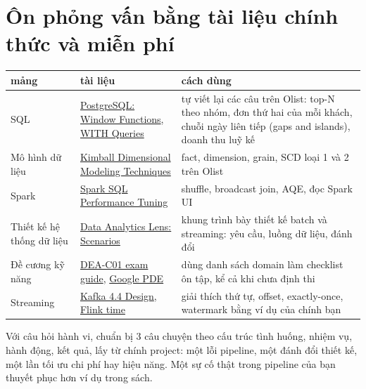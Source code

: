 \documentclass[11pt,a4paper,oneside]{report}
\newcommand{\thd}[1]{\textbf{\sffamily\small #1}}
\begin{document}
\section{Ôn phỏng vấn bằng tài liệu chính thức và miễn phí}
\begin{xltabular}{\textwidth}{@{}P{3.0cm} P{5.2cm} L@{}}
\toprule
\thd{mảng} & \thd{tài liệu} & \thd{cách dùng} \\
\midrule
\endhead
\bottomrule
\endfoot
SQL & \href{https://www.postgresql.org/docs/current/tutorial-window.html}{PostgreSQL: Window Functions}, \href{https://www.postgresql.org/docs/current/queries-with.html}{WITH Queries} & tự viết lại các câu trên Olist: top-N theo nhóm, đơn thứ hai của mỗi khách, chuỗi ngày liên tiếp (gaps and islands), doanh thu luỹ kế \\
Mô hình dữ liệu & \href{https://www.kimballgroup.com/data-warehouse-business-intelligence-resources/kimball-techniques/dimensional-modeling-techniques/}{Kimball Dimensional Modeling Techniques} & fact, dimension, grain, SCD loại 1 và 2 trên Olist \\
Spark & \href{https://spark.apache.org/docs/latest/sql-performance-tuning.html}{Spark SQL Performance Tuning} & shuffle, broadcast join, AQE, đọc Spark UI \\
Thiết kế hệ thống dữ liệu & \href{https://docs.aws.amazon.com/wellarchitected/latest/analytics-lens/scenarios.html}{Data Analytics Lens: Scenarios} & khung trình bày thiết kế batch và streaming: yêu cầu, luồng dữ liệu, đánh đổi \\
Đề cương kỹ năng & \href{https://docs.aws.amazon.com/aws-certification/latest/data-engineer-associate-01/data-engineer-associate-01.html}{DEA-C01 exam guide}, \href{https://cloud.google.com/learn/certification/data-engineer}{Google PDE} & dùng danh sách domain làm checklist ôn tập, kể cả khi chưa định thi \\
Streaming & \href{https://kafka.apache.org/44/design/design/}{Kafka 4.4 Design}, \href{https://nightlies.apache.org/flink/flink-docs-stable/docs/concepts/time/}{Flink time} & giải thích thứ tự, offset, exactly-once, watermark bằng ví dụ của chính bạn \\
\end{xltabular}

Với câu hỏi hành vi, chuẩn bị 3 câu chuyện theo cấu trúc tình huống, nhiệm vụ, hành động, kết quả, lấy từ chính project: một lỗi pipeline, một đánh đổi thiết kế, một lần tối ưu chi phí hay hiệu năng. Một sự cố thật trong pipeline của bạn thuyết phục hơn ví dụ trong sách.
\end{document}
